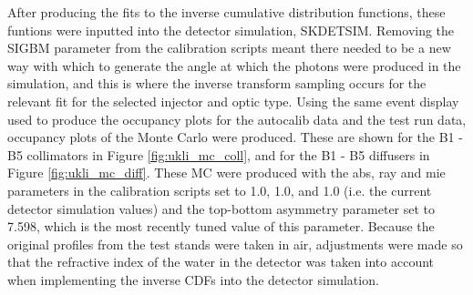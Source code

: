 After producing the fits to the inverse cumulative distribution functions, these funtions were inputted into the detector simulation, SKDETSIM. Removing the SIGBM parameter from the calibration scripts meant there needed to be a new way with which to generate the angle at which the photons were produced in the simulation, and this is where the inverse transform sampling occurs for the relevant fit for the selected injector and optic type. Using the same event display used to produce the occupancy plots for the autocalib data and the test run data, occupancy plots of the Monte Carlo were produced. These are shown for the B1 - B5 collimators in Figure \ref{fig:ukli_mc_coll}, and for the B1 - B5 diffusers in Figure \ref{fig:ukli_mc_diff}. These MC were produced with the abs, ray and mie parameters in the calibration scripts set to 1.0, 1.0, and 1.0 (i.e. the current detector simulation values) and the top-bottom asymmetry parameter set to 7.598, which is the most recently tuned value of this parameter. Because the original profiles from the test stands were taken in air, adjustments were made so that the refractive index of the water in the detector was taken into account when implementing the inverse CDFs into the detector simulation. 

